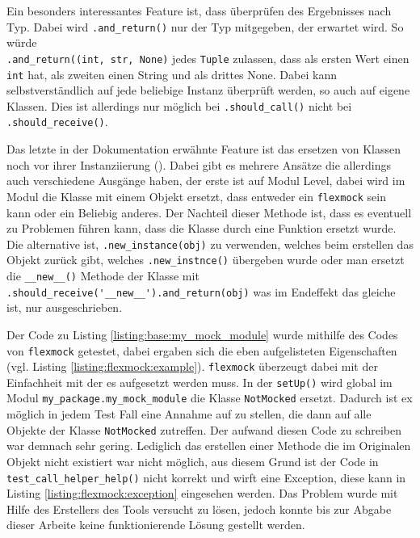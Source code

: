 Ein besonders interessantes Feature ist, dass überprüfen des Ergebnisses nach
Typ. Dabei wird \lstinline{.and_return()} nur der Typ mitgegeben, der erwartet
wird. So würde
\\%
\lstinline{.and_return((int, str, None)} jedes \lstinline{Tuple}
zulassen, dass als ersten Wert einen \lstinline{int} hat, als zweiten einen
String und als drittes None. Dabei kann selbstverständlich auf jede beliebige
Instanz überprüft werden, so auch auf eigene Klassen. Dies ist allerdings nur
möglich bei \lstinline{.should_call()} nicht bei \lstinline{.should_receive()}.

Das letzte in der Dokumentation erwähnte Feature ist das ersetzen von Klassen
noch vor ihrer Instanziierung (\cite{flexmock:docs:0.10.3}). Dabei gibt es
mehrere Ansätze die allerdings auch verschiedene Ausgänge haben, der erste ist
auf Modul Level, dabei wird im Modul die Klasse mit einem Objekt ersetzt, dass
entweder ein \lstinline{flexmock} sein kann oder ein Beliebig anderes. Der
Nachteil dieser Methode ist, dass es eventuell zu Problemen führen kann, dass
die Klasse durch eine Funktion ersetzt wurde. Die alternative ist,
\lstinline{.new_instance(obj)} zu verwenden, welches beim erstellen das Objekt
zurück gibt, welches \lstinline{.new_instnce()} übergeben wurde oder man ersetzt
die \lstinline{__new__()} Methode der Klasse mit
\lstinline{.should_receive('__new__').and_return(obj)} was im Endeffekt das
gleiche ist, nur ausgeschrieben.
\newline

Der Code zu Listing \ref{listing:base:my_mock_module} wurde mithilfe des Codes
von \lstinline{flexmock} getestet, dabei ergaben sich die eben aufgelisteten
Eigenschaften (vgl. Listing \ref{listing:flexmock:example}).
\lstinline{flexmock} überzeugt dabei mit der Einfachheit mit der es aufgesetzt
werden muss. In der \lstinline{setUp()} wird global im Modul
\lstinline{my_package.my_mock_module} die Klasse \lstinline{NotMocked} ersetzt.
Dadurch ist ex möglich in jedem Test Fall eine Annahme auf zu stellen, die dann
auf alle Objekte der Klasse \lstinline{NotMocked} zutreffen. Der aufwand diesen
Code zu schreiben war demnach sehr gering. Lediglich das erstellen einer
Methode die im Originalen Objekt nicht existiert war nicht möglich, aus diesem
Grund ist der Code in \lstinline{test_call_helper_help()} nicht korrekt und
wirft eine Exception, diese kann in Listing \ref{listing:flexmock:exception}
eingesehen werden. Das Problem wurde mit Hilfe des Erstellers des Tools
versucht zu lösen, jedoch konnte bis zur Abgabe dieser Arbeite keine
funktionierende Lösung gestellt werden.
\newline

